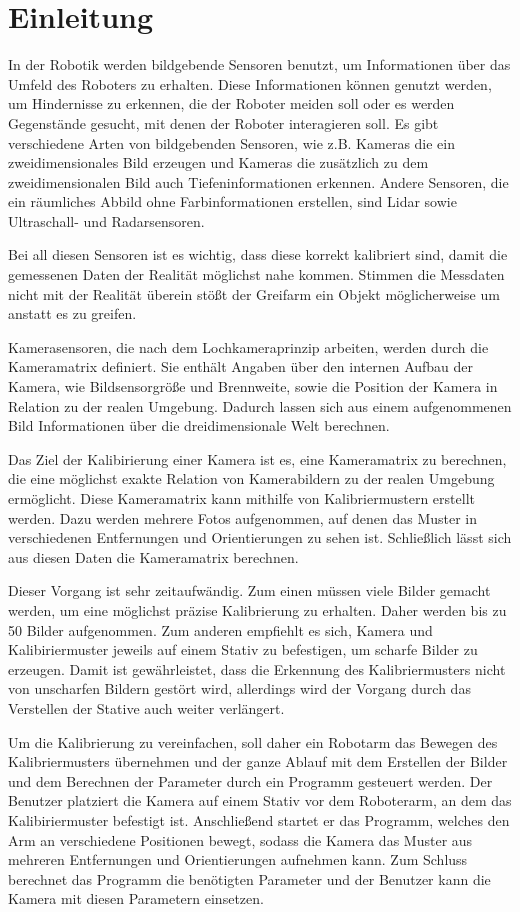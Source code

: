 \chapter{Einleitung}

In der Robotik werden bildgebende Sensoren benutzt, um Informationen über das Umfeld des Roboters zu erhalten. Diese Informationen können genutzt werden, um Hindernisse zu erkennen, die der Roboter meiden soll oder es werden Gegenstände gesucht, mit denen der Roboter interagieren soll. Es gibt verschiedene Arten von bildgebenden Sensoren, wie z.B. Kameras die ein zweidimensionales Bild erzeugen und Kameras die zusätzlich zu dem zweidimensionalen Bild auch Tiefeninformationen erkennen. Andere Sensoren, die ein räumliches Abbild ohne Farbinformationen erstellen, sind Lidar sowie Ultraschall- und Radarsensoren.

Bei all diesen Sensoren ist es wichtig, dass diese korrekt kalibriert sind, damit die gemessenen Daten der Realität möglichst nahe kommen. Stimmen die Messdaten nicht mit der Realität überein stößt der Greifarm ein Objekt möglicherweise um anstatt es zu greifen.

Kamerasensoren, die nach dem Lochkameraprinzip arbeiten, werden durch die Kameramatrix definiert. Sie enthält Angaben über den internen Aufbau der Kamera, wie Bildsensorgröße und Brennweite, sowie die Position der Kamera in Relation zu der realen Umgebung. Dadurch lassen sich aus einem aufgenommenen Bild Informationen über die dreidimensionale Welt berechnen. 

Das Ziel der Kalibirierung einer Kamera ist es, eine Kameramatrix zu berechnen, die eine möglichst exakte Relation von Kamerabildern zu der realen Umgebung ermöglicht. Diese Kameramatrix kann mithilfe von Kalibriermustern erstellt werden. Dazu werden mehrere Fotos aufgenommen, auf denen das Muster in verschiedenen Entfernungen und Orientierungen zu sehen ist. Schließlich lässt sich aus diesen Daten die Kameramatrix berechnen.

Dieser Vorgang ist sehr zeitaufwändig. Zum einen müssen viele Bilder gemacht werden, um eine möglichst präzise Kalibrierung zu erhalten. Daher werden bis zu 50 Bilder aufgenommen. Zum anderen empfiehlt es sich, Kamera und Kalibiriermuster jeweils auf einem Stativ zu befestigen, um scharfe Bilder zu erzeugen. Damit ist gewährleistet, dass die Erkennung des Kalibriermusters nicht von unscharfen Bildern gestört wird, allerdings wird der Vorgang durch das Verstellen der Stative auch weiter verlängert.

Um die Kalibrierung zu vereinfachen, soll daher ein Robotarm das Bewegen des Kalibriermusters übernehmen und der ganze Ablauf mit dem Erstellen der Bilder und dem Berechnen der Parameter durch ein Programm gesteuert werden. Der Benutzer platziert die Kamera auf einem Stativ vor dem Roboterarm, an dem das Kalibiriermuster befestigt ist. Anschließend startet er das Programm, welches den Arm an verschiedene Positionen bewegt, sodass die Kamera das Muster aus mehreren Entfernungen und Orientierungen aufnehmen kann. Zum Schluss berechnet das Programm die benötigten Parameter und der Benutzer kann die Kamera mit diesen Parametern einsetzen.